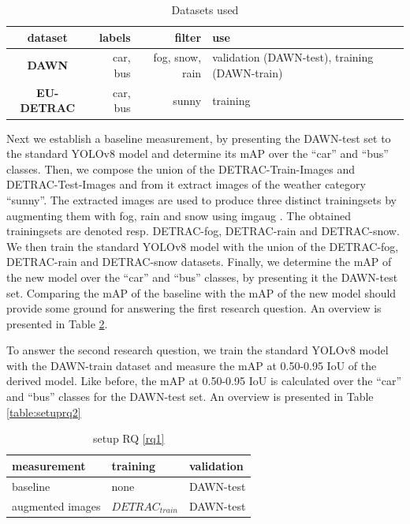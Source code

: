 \documentclass[]{article}
\begin{document}
	\begin{table}
		\centering
		\begin{tabular}{crrp{1.5in}}
			\toprule
			\textbf{dataset} & \textbf{labels} & \textbf{filter} & \textbf{use} \\
			\midrule
			\textbf{DAWN} & car, bus & fog, snow, rain & validation (DAWN-test), training (DAWN-train) \\
			\textbf{EU-DETRAC} & car, bus & sunny & training \\
			\bottomrule
		\end{tabular}
		\caption{Datasets used}
		\label{table:datasets}
	\end{table}



Next we establish a baseline measurement, by presenting the DAWN-test set to the standard YOLO{\small v8} model and determine its mAP over the ``car'' and ``bus'' classes. Then, we compose the union of the DETRAC-Train-Images and DETRAC-Test-Images and from it extract images of the weather category ``sunny''. The extracted images are used to produce three distinct trainingsets by augmenting them with fog, rain and snow using imgaug \cite{imgaug}. The obtained trainingsets are denoted resp. DETRAC-fog, DETRAC-rain and DETRAC-snow. We then train the standard YOLO{\small v8} model with the union of the DETRAC-fog, DETRAC-rain and DETRAC-snow datasets. Finally, we determine the mAP of the new model over the  ``car'' and ``bus'' classes, by presenting it the DAWN-test set. Comparing the mAP of the baseline with the mAP of the new model should provide some ground for answering the first research question.  An overview is presented in Table \ref{table:setuprq1}.

	To answer the second research question, we train the standard YOLO{\small v8} model with the DAWN-train dataset and measure the mAP at 0.50-0.95 IoU of the derived model. Like before, the mAP at 0.50-0.95 IoU is calculated over the ``car'' and ``bus'' classes for the DAWN-test set.  An overview is presented in Table \ref{table:setuprq2}

\begin{table}[!ht]
	\begin{tabular}{lll}
		\toprule
		\textbf{measurement} & \textbf{training} & \textbf{validation} \\
		\midrule
		baseline & none & DAWN-test \\
		augmented images & $DETRAC_{train}$ & DAWN-test \\
		\bottomrule
	\end{tabular}
	\caption{setup RQ \ref{rq1}}
	\label{table:setuprq1}
\end{table}
\end{document}
